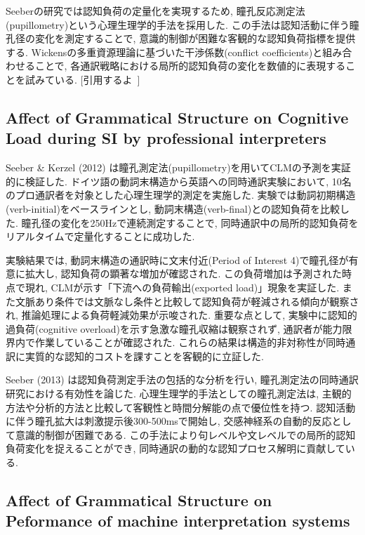 Seeberの研究では認知負荷の定量化を実現するため, 瞳孔反応測定法(pupillometry)という心理生理学的手法を採用した.
この手法は認知活動に伴う瞳孔径の変化を測定することで, 意識的制御が困難な客観的な認知負荷指標を提供する.
Wickensの多重資源理論に基づいた干渉係数(conflict coefficients)と組み合わせることで, 各通訳戦略における局所的認知負荷の変化を数値的に表現することを試みている.
[引用するよ~]

\subsection{Affect of Grammatical Structure on Cognitive Load during SI by professional interpreters}

Seeber \& Kerzel (2012) \cite{seeber2012cognitive}は瞳孔測定法(pupillometry)を用いてCLMの予測を実証的に検証した.
ドイツ語の動詞末構造から英語への同時通訳実験において, 10名のプロ通訳者を対象とした心理生理学的測定を実施した.
実験では動詞初期構造(verb-initial)をベースラインとし, 動詞末構造(verb-final)との認知負荷を比較した.
瞳孔径の変化を250Hzで連続測定することで, 同時通訳中の局所的認知負荷をリアルタイムで定量化することに成功した.

実験結果では, 動詞末構造の通訳時に文末付近(Period of Interest 4)で瞳孔径が有意に拡大し, 認知負荷の顕著な増加が確認された.
この負荷増加は予測された時点で現れ, CLMが示す「下流への負荷輸出(exported load)」現象を実証した.
また文脈あり条件では文脈なし条件と比較して認知負荷が軽減される傾向が観察され, 推論処理による負荷軽減効果が示唆された.
重要な点として, 実験中に認知的過負荷(cognitive overload)を示す急激な瞳孔収縮は観察されず, 通訳者が能力限界内で作業していることが確認された.
これらの結果は構造的非対称性が同時通訳に実質的な認知的コストを課すことを客観的に立証した.

Seeber (2013) \cite{seeber2013cognitive}は認知負荷測定手法の包括的な分析を行い, 瞳孔測定法の同時通訳研究における有効性を論じた.
心理生理学的手法としての瞳孔測定法は, 主観的方法や分析的方法と比較して客観性と時間分解能の点で優位性を持つ.
認知活動に伴う瞳孔拡大は刺激提示後300-500msで開始し, 交感神経系の自動的反応として意識的制御が困難である.
この手法により句レベルや文レベルでの局所的認知負荷変化を捉えることができ, 同時通訳の動的な認知プロセス解明に貢献している.



\subsection{Affect of Grammatical Structure on Peformance of machine interpretation systems}


